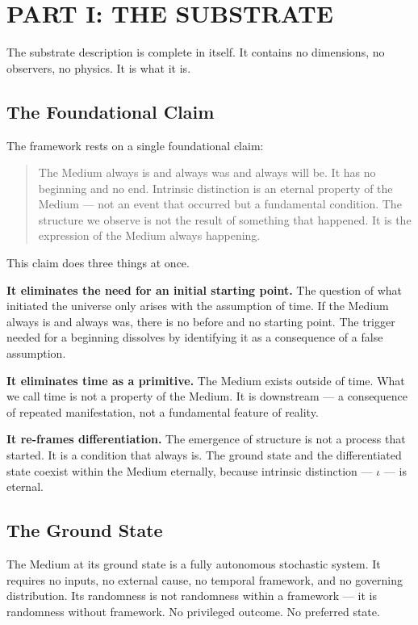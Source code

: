 \documentclass[11pt,letterpaper]{article}
\begin{document}
\section{PART I: THE SUBSTRATE}
\label{sec:orgfb2dbd2}

The substrate description is complete in itself. It contains no dimensions, no observers, no physics. It is what it is.
\subsection{The Foundational Claim}
\label{sec:org4982935}

The framework rests on a single foundational claim:

\begin{quote}
The Medium always is and always was and always will be. It has no beginning and no end. Intrinsic distinction is an eternal property of the Medium --- not an event that occurred but a fundamental condition. The structure we observe is not the result of something that happened. It is the expression of the Medium always happening.
\end{quote}

This claim does three things at once.

\textbf{It eliminates the need for an initial starting point.} The question of what initiated the universe only arises with the assumption of time. If the Medium always is and always was, there is no before and no starting point. The trigger needed for a beginning dissolves by identifying it as a consequence of a false assumption.

\textbf{It eliminates time as a primitive.} The Medium exists outside of time. What we call time is not a property of the Medium. It is downstream --- a consequence of repeated manifestation, not a fundamental feature of reality.

\textbf{It re-frames differentiation.} The emergence of structure is not a process that started. It is a condition that always is. The ground state and the differentiated state coexist within the Medium eternally, because intrinsic distinction --- \(\iota\) --- is eternal.
\subsection{The Ground State}
\label{sec:orgcd438f7}

The Medium at its ground state is a fully autonomous stochastic system. It requires no inputs, no external cause, no temporal framework, and no governing distribution. Its randomness is not randomness within a framework --- it is randomness without framework. No privileged outcome. No preferred state.
\end{document}
